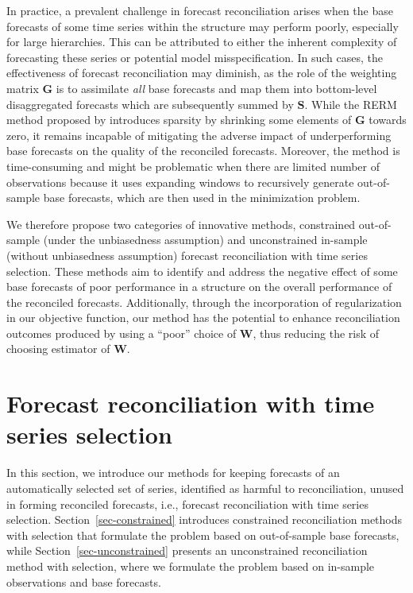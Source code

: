 \documentclass[11pt,a4paper,]{article}
\begin{document}
In practice, a prevalent challenge in forecast reconciliation arises
when the base forecasts of some time series within the structure may
perform poorly, especially for large hierarchies. This can be attributed
to either the inherent complexity of forecasting these series or
potential model misspecification. In such cases, the effectiveness of
forecast reconciliation may diminish, as the role of the weighting
matrix \(\boldsymbol{G}\) is to assimilate \emph{all} base forecasts and
map them into bottom-level disaggregated forecasts which are
subsequently summed by \(\boldsymbol{S}\). While the RERM method
proposed by \textcite{Ben_Taieb2019-be} introduces sparsity by shrinking
some elements of \(\boldsymbol{G}\) towards zero, it remains incapable
of mitigating the adverse impact of underperforming base forecasts on
the quality of the reconciled forecasts. Moreover, the method is
time-consuming and might be problematic when there are limited number of
observations because it uses expanding windows to recursively generate
out-of-sample base forecasts, which are then used in the minimization
problem.

We therefore propose two categories of innovative methods, constrained
out-of-sample (under the unbiasedness assumption) and unconstrained
in-sample (without unbiasedness assumption) forecast reconciliation with
time series selection. These methods aim to identify and address the
negative effect of some base forecasts of poor performance in a
structure on the overall performance of the reconciled forecasts.
Additionally, through the incorporation of regularization in our
objective function, our method has the potential to enhance
reconciliation outcomes produced by using a ``poor'' choice of
\(\boldsymbol{W}\), thus reducing the risk of choosing estimator of
\(\boldsymbol{W}\).

\hypertarget{sec-methodology}{%
\section{Forecast reconciliation with time series
selection}\label{sec-methodology}}

In this section, we introduce our methods for keeping forecasts of an
automatically selected set of series, identified as harmful to
reconciliation, unused in forming reconciled forecasts, i.e., forecast
reconciliation with time series selection. Section~\ref{sec-constrained}
introduces constrained reconciliation methods with selection that
formulate the problem based on out-of-sample base forecasts, while
Section~\ref{sec-unconstrained} presents an unconstrained reconciliation
method with selection, where we formulate the problem based on in-sample
observations and base forecasts.
\end{document}
